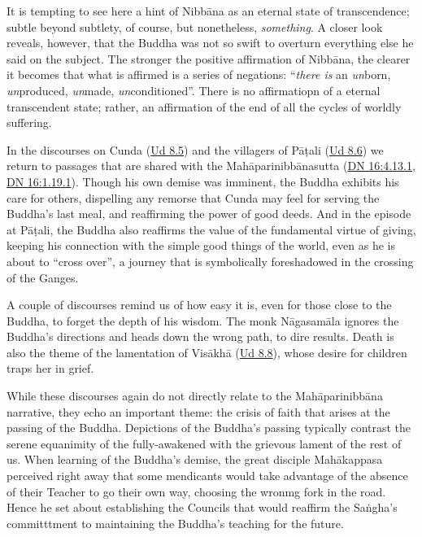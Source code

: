 \documentclass[12pt,openany]{book}%
\begin{document}
It is tempting to see here a hint of \textsanskrit{Nibbāna} as an eternal state of transcendence; subtle beyond subtlety, of course, but nonetheless, \emph{something}. A closer look reveals, however, that the Buddha was not so swift to overturn everything else he said on the subject. The stronger the positive affirmation of \textsanskrit{Nibbāna}, the clearer it becomes that what is affirmed is a series of negations: “\emph{there is} an \emph{un}born, \emph{un}produced, \emph{un}made, \emph{un}conditioned”. There is no affirmatiopn of a eternal transcendent state; rather, an affirmation of the end of all the cycles of worldly suffering.

In the discourses on Cunda (\href{https://suttacentral.net/ud8.5/en/sujato}{Ud 8.5}) and the villagers of \textsanskrit{Pāṭali} (\href{https://suttacentral.net/ud8.6/en/sujato}{Ud 8.6}) we return to passages that are shared with the \textsanskrit{Mahāparinibbānasutta} (\href{https://suttacentral.net/dn16/en/sujato\#4.13.1}{DN 16:4.13.1}, \href{https://suttacentral.net/dn16/en/sujato\#1.19.1}{DN 16:1.19.1}). Though his own demise was imminent, the Buddha exhibits his care for others, dispelling any remorse that Cunda may feel for serving the Buddha’s last meal, and reaffirming the power of good deeds. And in the episode at \textsanskrit{Pāṭali}, the Buddha also reaffirms the value of the fundamental virtue of giving, keeping his connection with the simple good things of the world, even as he is about to “cross over”, a journey that is symbolically foreshadowed in the crossing of the Ganges. 

A couple of discourses remind us of how easy it is, even for those close to the Buddha, to forget the depth of his wisdom. The monk \textsanskrit{Nāgasamāla} ignores the Buddha’s directions and heads down the wrong path, to dire results. Death is also the theme of the lamentation of \textsanskrit{Visākhā} (\href{https://suttacentral.net/ud8.8/en/sujato}{Ud 8.8}), whose desire for children traps her in grief. 

While these discourses again do not directly relate to the \textsanskrit{Mahāparinibbāna} narrative, they echo an important theme: the crisis of faith that arises at the passing of the Buddha. Depictions of the Buddha’s passing typically contrast the serene equanimity of the fully-awakened with the grievous lament of the rest of us. When learning of the Buddha’s demise, the great disciple \textsanskrit{Mahākappasa} perceived right away that some mendicants would take advantage of the absence of their Teacher to go their own way, choosing the wronmg fork in the road. Hence he set about establishing the Councils that would reaffirm the \textsanskrit{Saṅgha}’s committtment to maintaining the Buddha’s teaching for the future.
\end{document}
